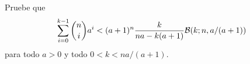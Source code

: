 \begin{statement}{28}
  Pruebe que
  \[
    \sum_{i = 0}^{k - 1} \binom{n}{i} a^i < (a + 1)^n \frac{k}{na - k(a + 1)} \mathcal{B}(k; n, a / (a + 1))
  \]
  para todo $a > 0$ y todo $0 < k < na/(a + 1)$.
\end{statement}